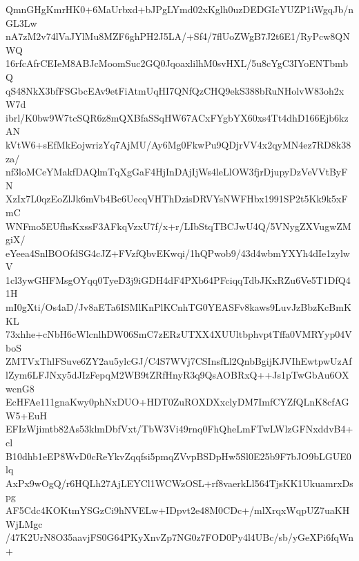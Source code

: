 QmnGHgKmrHK0+6MaUrbxd+bJPgLYmd02xKglh0uzDEDGIcYUZP1iWgqJb/nGL3Lw
nA7zM2v74lVaJYlMu8MZF6ghPH2J5LA/+Sf4/7flUoZWgB7J2t6E1/RyPcw8QNWQ
16rfcAfrCEIeM8ABJcMoomSuc2GQ0JqoaxlilhM0svHXL/5u8cYgC3IYoENTbmbQ
qS48NkX3bfFSGbcEAv9etFiAtmUqHI7QNfQzCHQ9ekS388bRuNHolvW83oh2xW7d
ibrl/K0bw9W7tcSQR6z8mQXBfaSSqHW67ACxFYgbYX60xs4Tt4dhD166Ejb6kzAN
kVtW6+sEfMkEojwrizYq7AjMU/Ay6Mg0FkwPu9QDjrVV4x2qyMN4ez7RD8k38za/
nf3loMCeYMakfDAQlmTqXgGaF4HjInDAjIjWs4leLlOW3fjrDjupyDzVeVVtByFN
XzIx7L0qzEoZlJk6mVb4Bc6UecqVHThDzisDRVYsNWFHbx1991SP2t5Kk9k5xFmC
WNFmo5EUfhsKxssF3AFkqVzxU7f/x+r/LIbStqTBCJwU4Q/5VNygZXVugwZMgiX/
eYeea4SnlBOOfdSG4cJZ+FVzfQbvEKwqi/1hQPwob9/43d4wbmYXYh4dIe1zylwV
1cl3ywGHFMsgOYqq0TyeD3j9iGDH4dF4PXb64PFciqqTdbJKxRZu6Ve5T1DfQ41H
mI0gXti/Os4aD/Jv8aETa6ISMlKnPlKCnhTG0YEASFv8kaws9LuvJzBbzKcBmKKL
73xhhe+cNbH6cWlcnlhDW06SmC7zERzUTXX4XUUltbphvptTffa0VMRYyp04VboS
ZMTVxThlFSuve6ZY2au5ylcGJ/C4S7WVj7CSInsfLl2QnbBgijKJVIhEwtpwUzAf
lZym6LFJNxy5dJIzFepqM2WB9tZRfHnyR3q9QsAOBRxQ++Js1pTwGbAu6OXwcnG8
EcHFAe111gnaKwy0phNxDUO+HDT0ZuROXDXxclyDM7ImfCYZfQLnK8cfAGW5+EuH
EFIzWjimtb82As53klmDbfVxt/TbW3Vi49rnq0FhQheLmFTwLWlzGFNxddvB4+cl
B10dhb1eEP8WvD0cReYkvZqqfsi5pmqZVvpBSDpHw5Sl0E25b9F7bJO9bLGUE0lq
AxPx9wOgQ/r6HQLh27AjLEYCl1WCWzOSL+rf8vaerkLl564TjsKK1UkuamrxDspg
AF5Cdc4KOKtmYSGzCi9hNVELw+IDpvt2e48M0CDc+/mlXrqxWqpUZ7uaKHWjLMgc
/47K2UrN8O35aavjFS0G64PKyXnvZp7NG0z7FOD0Py4l4UBc/sb/yGeXPi6fqWn+
